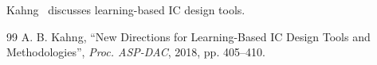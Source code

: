 Kahng~\cite{Kahng18} discusses learning-based IC design tools.

\begin{thebibliography}{99}
A. B. Kahng,
``New Directions for Learning-Based IC Design Tools and Methodologies'',
{\em Proc. ASP-DAC}, 2018, pp. 405--410.
\end{thebibliography}
